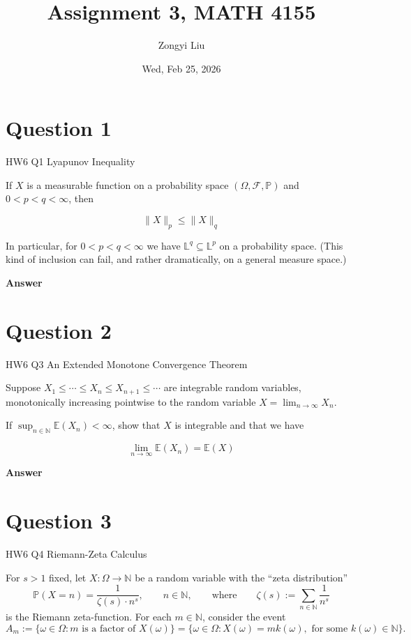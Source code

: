 \documentclass[letterpaper]{article}
\title{Assignment 3, MATH 4155}
\author{Zongyi Liu}
\date{Wed, Feb 25, 2026}
\begin{document}
		\maketitle
		
		\section{Question 1}
		
		{\color{deepred} HW6 Q1 Lyapunov Inequality}
		
		If $X$ is a measurable function on a probability space $(\Omega, \mathcal{F}, \mathbb{P})$ and $0<p<q<\infty$, then
		
		$$
		\|X\|_{p} \leq\|X\|_{q}
		$$
		
		In particular, for $0<p<q<\infty$ we have $\mathbb{L}^{q} \subseteq \mathbb{L}^{p}$ on a probability space. (This kind of inclusion can fail, and rather dramatically, on a general measure space.)
		
		
		
		\textbf{Answer}
		
		\clearpage
		
		\section{Question 2}
		
		{\color{deepred} HW6 Q3 An Extended Monotone Convergence Theorem}
		
		Suppose $X_{1} \leq \cdots \leq X_{n} \leq X_{n+1} \leq \cdots$ are integrable random variables, monotonically increasing pointwise to the random variable $X=\lim _{n \rightarrow \infty} X_{n}$.
		
		If $\sup _{n \in \mathbb{N}} \mathbb{E}\left(X_{n}\right)<\infty$, show that $X$ is integrable and that we have
		
		$$
		\lim _{n \rightarrow \infty} \mathbb{E}\left(X_{n}\right)=\mathbb{E}(X)
		$$
		
		\textbf{Answer}
		
			
		
		\clearpage
		
		\section{Question 3}
		
		{\color{deepred} HW6 Q4 Riemann-Zeta Calculus} 
		
		For $s>1$ fixed, let $X:\Omega\to\mathbb{N}$ be a random variable with the ``zeta distribution''
		\[
		\mathbb{P}(X=n)=\frac{1}{\zeta(s)\cdot n^{s}}, \qquad n\in\mathbb{N}, 
		\qquad \text{where} \qquad 
		\zeta(s):=\sum_{n\in\mathbb{N}}\frac{1}{n^{s}}
		\]
		is the Riemann zeta-function. For each $m\in\mathbb{N}$, consider the event
		\[
		A_m:=\{\omega\in\Omega: m \text{ is a factor of } X(\omega)\}
		=\{\omega\in\Omega: X(\omega)=m k(\omega), \text{ for some } k(\omega)\in\mathbb{N}\}.
		\]
		
\end{document}
